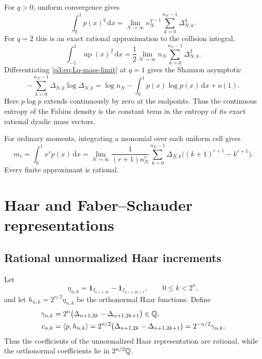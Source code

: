\documentclass[11pt]{article}
\theoremstyle{definition}
\theoremstyle{remark}
\newcommand{\dd}{\,\mathrm d}
\newcommand{\Up}{\operatorname{up}}
\newcommand{\one}{\mathbf 1}
\begin{document}
For $q>0$, uniform convergence gives
\begin{equation}\label{p3:eq:Lq-mass-limit}
 \int_0^1p(x)^q\dd x
 =\lim_{N\to\infty}n_N^{q-1}
  \sum_{k=0}^{n_N-1}\Delta_{N,k}^q.
\end{equation}
For $q=2$ this is an exact rational approximation to the collision integral,
\begin{equation}\label{p3:eq:up-L2-masses}
 \int_{-1}^1\Up(x)^2\dd x
 =\frac12\lim_{N\to\infty}n_N
  \sum_{k=0}^{n_N-1}\Delta_{N,k}^2.
\end{equation}
Differentiating \eqref{p3:eq:Lq-mass-limit} at $q=1$ gives the Shannon asymptotic
\begin{equation}\label{p3:eq:mass-entropy}
 -\sum_{k=0}^{n_N-1}\Delta_{N,k}\log\Delta_{N,k}
 =\log n_N-\int_0^1p(x)\log p(x)\dd x+o(1).
\end{equation}
Here $p\log p$ extends continuously by zero at the endpoints.  Thus the
continuous entropy of the Fabius density is the constant term in the entropy of
its exact rational dyadic mass vectors.

For ordinary moments, integrating a monomial over each uniform cell gives
\begin{equation}\label{p3:eq:moment-cell-limit-clean}
 m_r=\int_0^1x^rp(x)\dd x
 =\lim_{N\to\infty}
 \frac{1}{(r+1)n_N^{r}}
 \sum_{k=0}^{n_N-1}\Delta_{N,k}
 \bigl((k+1)^{r+1}-k^{r+1}\bigr).
\end{equation}
Every finite approximant is rational.

\section{Haar and Faber--Schauder representations}
\label{p3:sec:haar-schauder}

\subsection{Rational unnormalized Haar increments}

Let
\begin{equation}\label{p3:eq:eta-haar}
 \eta_{n,k}
 =\one_{I_{n+1,2k}}-\one_{I_{n+1,2k+1}},
 \qquad 0\le k<2^n,
\end{equation}
and let $h_{n,k}=2^{n/2}\eta_{n,k}$ be the orthonormal Haar functions.
Define
\begin{align}
 \gamma_{n,k}
 &=2^n\bigl(\Delta_{n+1,2k}-\Delta_{n+1,2k+1}\bigr)\in\mathbb Q,
 \label{p3:eq:gamma-rational}\\
 c_{n,k}
 &=\langle p,h_{n,k}\rangle
 =2^{n/2}\bigl(\Delta_{n+1,2k}-\Delta_{n+1,2k+1}\bigr)
 =2^{-n/2}\gamma_{n,k}.
 \label{p3:eq:c-orthonormal}
\end{align}
Thus the coefficients of the unnormalized Haar representation are rational,
while the orthonormal coefficients lie in $2^{n/2}\mathbb Q$.
\end{document}
